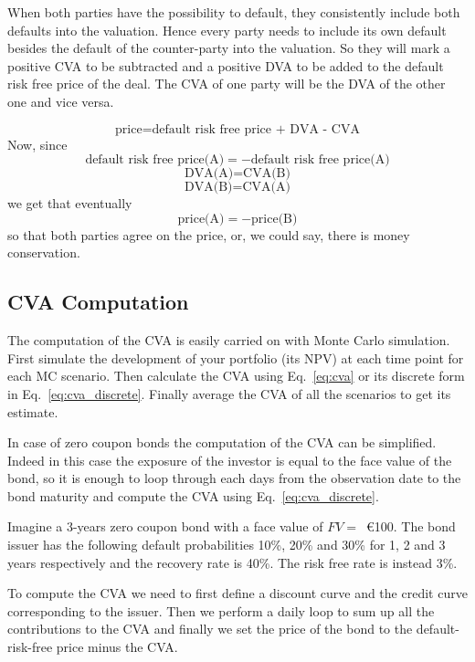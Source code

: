 When both parties have the possibility to default, they consistently include both defaults into the valuation. Hence
every party needs to include its own default besides the default of the counter-party into the valuation. So they will mark a positive CVA to be subtracted and a positive DVA to be added to the default risk free price of the deal. The CVA of one party will be the DVA of the other one and vice versa.

\[
\textrm{price}=\textrm{default risk free price + DVA - CVA}
\]
Now, since
\[
\textrm{default risk free price(A)} = - \textrm{default risk free price(A)}
\]
\[
\textrm{DVA(A)} = \textrm{CVA(B)}
\]
\[
\textrm{DVA(B)} = \textrm{CVA(A)}
\]
we get that eventually
\[
\textrm{price(A)} = -\textrm{price(B)}
\]
so that both parties agree on the price, or, we could say, there is money conservation.

\subsection{CVA Computation}

The computation of the CVA is easily carried on with Monte Carlo simulation. First simulate the development of your portfolio (its NPV) at each time point for each MC scenario. Then calculate the CVA using Eq.~\ref{eq:cva} or its discrete form in Eq.~\ref{eq:cva_discrete}. Finally average the CVA of all the scenarios to get its estimate.

In case of zero coupon bonds the computation of the CVA can be simplified. Indeed in this case the exposure of the investor is equal to the face value of the bond, so it is enough to loop through each days from the observation date to the bond maturity and compute the CVA using Eq.~\ref{eq:cva_discrete}.

Imagine a 3-years zero coupon bond with a face value of $FV=$~\euro{100}. The bond issuer has the following default probabilities 10\%, 20\% and 30\% for 1, 2 and 3 years respectively and the recovery rate is 40\%. The risk free rate is instead 3\%. 

To compute the CVA we need to first define a discount curve and the credit curve corresponding to the issuer. Then we perform a daily loop to sum up all the contributions to the CVA and finally we set the price of the bond to the default-risk-free price minus the CVA.


